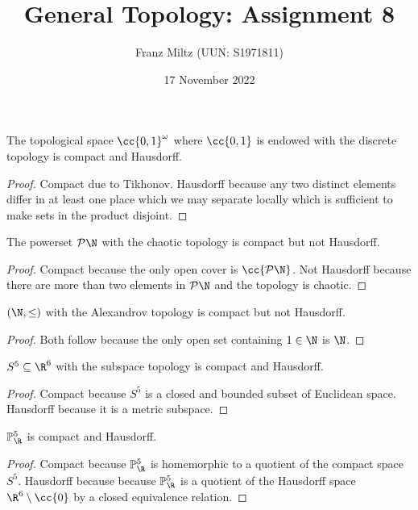\documentclass{article}
\begin{document}
\title{General Topology: Assignment 8}
\author{Franz Miltz (UUN: S1971811)}
\date{17 November 2022}
\maketitle

\begin{claim*}
  The topological space $\cc{0,1}^\omega$ where $\cc{0,1}$ is endowed with the discrete
  topology is compact and Hausdorff.
  \begin{proof}
    Compact due to Tikhonov. Hausdorff because any two distinct elements differ in at 
    least one place which we may separate locally which is sufficient to make
    sets in the product disjoint.
  \end{proof}
\end{claim*}

\begin{claim*}
  The powerset $\mathcal P\N$ with the chaotic topology is compact but not Hausdorff.
  \begin{proof}
    Compact because the only open cover is $\cc{\mathcal P\N}$. Not Hausdorff because there
    are more than two elements in $\mathcal P\N$ and the topology is chaotic.
  \end{proof}
\end{claim*}

\begin{claim*}
  $(\N, \leq)$ with the Alexandrov topology is compact but not Hausdorff.
  \begin{proof}
    Both follow because the only open set containing $1\in\N$ is $\N$.
  \end{proof}
\end{claim*}

\begin{claim*}
  $S^5\subseteq\R^6$ with the subspace topology is compact and Hausdorff.
  \begin{proof}
    Compact because $S^5$ is a closed and bounded subset of Euclidean space. Hausdorff
    because it is a metric subspace.
  \end{proof}
\end{claim*}

\begin{claim*}
  $\mathbb P^5_\R$ is compact and Hausdorff.
  \begin{proof}
    Compact because $\mathbb P^5_\R$ is homemorphic to a quotient of the compact space $S^5$.
    Hausdorff because because $\mathbb P^5_\R$ is a quotient of the Hausdorff space $\R^6\setminus\cc{0}$
    by a closed equivalence relation.
  \end{proof}
\end{claim*}
\end{document}
